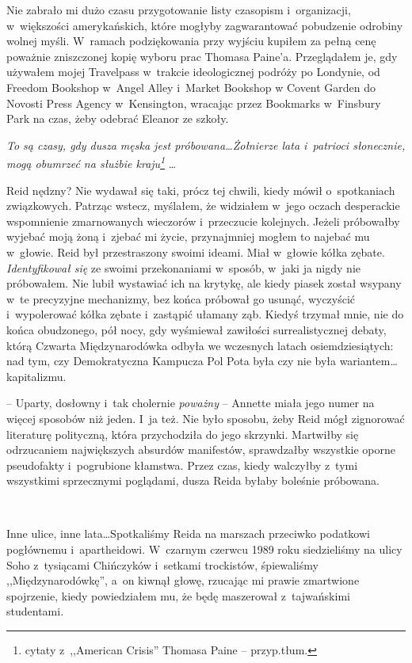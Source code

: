 \documentclass[oneside,polish,11pt,sfheadings]{mwbk}
\begin{document}
Nie zabrało mi dużo czasu przygotowanie listy czasopism i~organizacji, w~większości amerykańskich, które mogłyby zagwarantować pobudzenie
odrobiny wolnej myśli. W~ramach podziękowania przy wyjściu kupiłem za
pełną cenę poważnie zniszczonej kopię wyboru prac Thomasa Paine'a.
Przeglądałem je, gdy używałem mojej Travelpass w~trakcie ideologicznej
podróży po Londynie, od Freedom Bookshop w~Angel Alley i~Market Bookshop
w Covent Garden do Novosti Press Agency w~Kensington, wracając przez
Bookmarks w~Finsbury Park na czas, żeby odebrać Eleanor ze szkoły.

\emph{To są czasy, gdy dusza męska jest próbowana\ldots Żołnierze lata i~patrioci słonecznie, mogą obumrzeć na służbie kraju\footnote{cytaty z~,,American Crisis'' Thomasa Paine -- przyp.tłum.}} \ldots 

Reid nędzny? Nie wydawał się taki, prócz tej chwili, kiedy mówił o~spotkaniach związkowych. Patrząc wstecz, myślałem, że widziałem w~jego
oczach desperackie wspomnienie zmarnowanych wieczorów i~przeczucie
kolejnych. Jeżeli próbowałby wyjebać moją żoną i~zjebać mi życie,
przynajmniej mogłem to najebać mu w~głowie. Reid był przestraszony
swoimi ideami. Miał w~głowie kółka zębate. \emph{Identyfikował się} ze
swoimi przekonaniami w~sposób, w~jaki ja nigdy nie próbowałem. Nie lubił
wystawiać ich na krytykę, ale kiedy piasek został wsypany w~te
precyzyjne mechanizmy, bez końca próbował go usunąć, wyczyścić i~wypolerować kółka zębate i~zastąpić ułamany ząb. Kiedyś trzymał mnie,
nie do końca obudzonego, pół nocy, gdy wyśmiewał zawiłości
surrealistycznej debaty, którą Czwarta Międzynarodówka odbyła we
wczesnych latach osiemdziesiątych: nad tym, czy Demokratyczna Kampucza
Pol Pota była czy nie była wariantem\ldots kapitalizmu.

-- Uparty, dosłowny i~tak cholernie \emph{poważny} -- Annette miała jego
numer na więcej sposobów niż jeden. I~ja też. Nie było sposobu, żeby
Reid mógł zignorować literaturę polityczną, która przychodziła do jego
skrzynki. Martwiłby się odrzucaniem największych absurdów manifestów,
sprawdzałby wszystkie oporne pseudofakty i~pogrubione kłamstwa. Przez
czas, kiedy walczyłby z~tymi wszystkimi sprzecznymi poglądami, dusza
Reida byłaby boleśnie próbowana.

~

Inne ulice, inne lata\ldots Spotkaliśmy Reida na marszach przeciwko
podatkowi pogłównemu i~apartheidowi. W~czarnym czerwcu 1989 roku
siedzieliśmy na ulicy Soho z~tysiącami Chińczyków i~setkami trockistów,
śpiewaliśmy ,,Międzynarodówkę'', a~on kiwnął głowę, rzucając mi prawie
zmartwione spojrzenie, kiedy powiedziałem mu, że będę maszerował z~tajwańskimi studentami.
\end{document}
